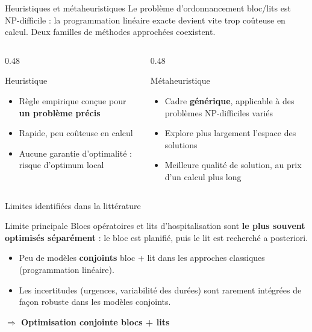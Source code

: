 \begin{frame}{Heuristiques et métaheuristiques}
  \small
  Le problème d'ordonnancement bloc/lits est \alert{NP-difficile} : la
  programmation linéaire exacte devient vite trop coûteuse en calcul. Deux
  familles de méthodes approchées coexistent.
  \vspace{0.2em}
  \begin{columns}[T]
    \begin{column}{0.48\textwidth}
      \begin{block}{Heuristique}
        \small
        \begin{itemize}
          \item Règle empirique conçue pour \textbf{un problème précis}
          \item Rapide, peu coûteuse en calcul
          \item Aucune garantie d'optimalité : risque d'optimum local
        \end{itemize}
      \end{block}
    \end{column}
    \begin{column}{0.48\textwidth}
      \begin{block}{Métaheuristique}
        \small
        \begin{itemize}
          \item Cadre \textbf{générique}, applicable à des problèmes
          NP-difficiles variés
          \item Explore plus largement l'espace des solutions
          \item Meilleure qualité de solution, au prix d'un calcul plus long
        \end{itemize}
      \end{block}
    \end{column}
  \end{columns}
\end{frame}

\begin{frame}{Limites identifiées dans la littérature}
  \begin{alertblock}{Limite principale}
    Blocs opératoires et lits d'hospitalisation sont \textbf{le plus souvent
    optimisés séparément} : le bloc est planifié, puis le lit est recherché
    a posteriori.
  \end{alertblock}
  \begin{itemize}
    \item Peu de modèles \textbf{conjoints} bloc + lit dans les approches
    classiques (programmation linéaire).
    \item Les incertitudes (urgences, variabilité des durées) sont rarement
    intégrées de façon robuste dans les modèles conjoints.
  \end{itemize}
  \begin{center}
    \large \textcolor{mcmPrimary}{\textbf{$\Rightarrow$ Optimisation conjointe blocs + lits}}
  \end{center}
\end{frame}
